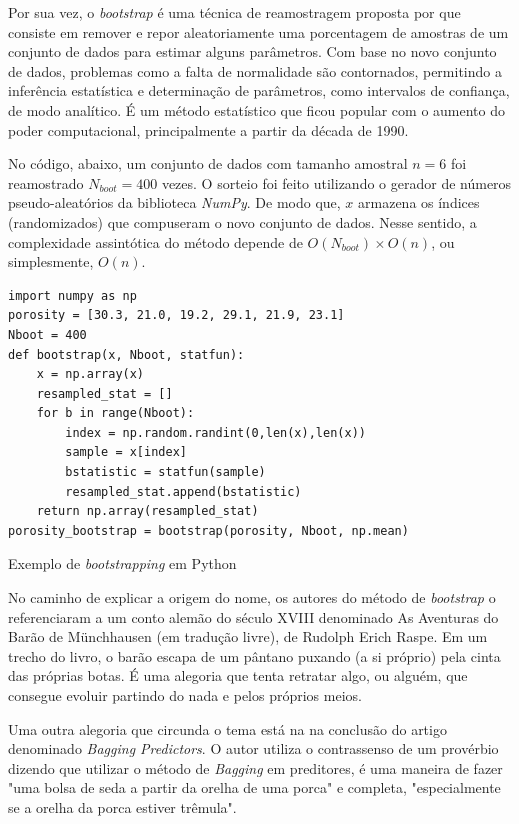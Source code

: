 \documentclass{article}
\begin{document}
Por sua vez, o \textit{bootstrap} é uma técnica de reamostragem proposta por \cite{Efron_1993} que consiste em remover e repor aleatoriamente uma porcentagem de amostras de um conjunto de dados para estimar alguns parâmetros. Com base no novo conjunto de dados, problemas como a falta de normalidade são contornados, permitindo a inferência estatística e determinação de parâmetros, como intervalos de confiança, de modo analítico. É um método estatístico que ficou popular com o aumento do poder computacional, principalmente a partir da década de 1990.

No código, abaixo, um conjunto de dados com tamanho amostral $n=6$ foi reamostrado $N_{boot}=400$ vezes. O sorteio foi feito utilizando o gerador de números pseudo-aleatórios da biblioteca \textit{NumPy}\cite{Harris_2020}. De modo que, $x$ armazena os índices (randomizados) que compuseram o novo conjunto de dados. Nesse sentido, a complexidade assintótica do método depende de $O(N_{boot}) \times O(n)$, ou simplesmente, $O(n)$.

\begin{listing}[!ht]
\begin{verbatim}
import numpy as np
porosity = [30.3, 21.0, 19.2, 29.1, 21.9, 23.1]
Nboot = 400
def bootstrap(x, Nboot, statfun):
    x = np.array(x)
    resampled_stat = []
    for b in range(Nboot):
        index = np.random.randint(0,len(x),len(x))
        sample = x[index]
        bstatistic = statfun(sample)
        resampled_stat.append(bstatistic)
    return np.array(resampled_stat)
porosity_bootstrap = bootstrap(porosity, Nboot, np.mean)
\end{verbatim}
\caption{Exemplo de \emph{bootstrapping} em Python}
\end{listing}


No caminho de explicar a origem do nome, os autores do método de \textit{bootstrap} \cite{Efron_1993} o referenciaram a um conto alemão do século XVIII denominado As Aventuras do Barão de Münchhausen (em tradução livre), de Rudolph Erich Raspe. Em um trecho do livro, o barão escapa de um pântano puxando (a si próprio) pela cinta das próprias botas. É uma alegoria que tenta retratar algo, ou alguém, que consegue evoluir partindo do nada e pelos próprios meios.

Uma outra alegoria que circunda o tema está na na conclusão do artigo denominado \emph{Bagging Predictors}. O autor \cite{Breiman_1996} utiliza o contrassenso de um provérbio dizendo que utilizar o método de \emph{Bagging} em preditores, é uma maneira de fazer "uma bolsa de seda a partir da orelha de uma porca" e completa, "especialmente se a orelha da porca estiver trêmula". 
\end{document}
